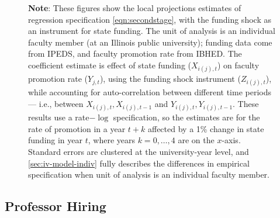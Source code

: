 \begin{figure}[H]
\begin{subfigure}[b]{0.495\textwidth}
        \label{fig:exit-administrator-illinois-lp-rolling}
    \end{subfigure}
    \label{fig:exit-illinois-lp-rolling}
    \justify
    \footnotesize
    \textbf{Note}:
    These figures show the local projections estimates of regression specification \eqref{eqn:secondstage}, with the funding shock as an instrument for state funding.
    The unit of analysis is an individual faculty member (at an Illinois public university); funding data come from IPEDS, and faculty promotion rate from IBHED.
    The coefficient estimate is effect of state funding ($X_{i(j),t}$) on faculty promotion rate ($Y_{j,t}$), using the funding shock instrument ($Z_{i(j),t}$), while accounting for auto-correlation between different time periods --- i.e., between $X_{i(j),t}, X_{i(j),t-1}$ and $Y_{i(j),t}, Y_{i(j),t-1}$.
    These results use a rate$-\log$ specification, so the estimates are for the rate of promotion in a year $t+k$ affected by a 1\% change in state funding in year $t$, where years $k = 0, \hdots, 4$ are on the $x$-axis. 
    Standard errors are clustered at the university-year level, and \autoref{sec:iv-model-indiv} fully describes the differences in empirical specification when unit of analysis is an individual faculty member.
\end{figure}




\newpage
\subsection{Professor Hiring}
\label{sec:appendix-hiring}

